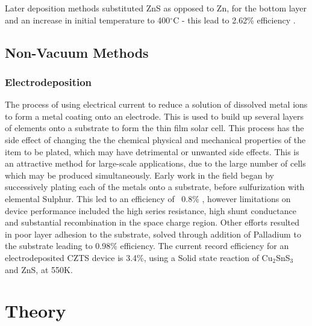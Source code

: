 Later deposition methods substituted ZnS as opposed to Zn, for the bottom layer and an increase in initial temperature to 400$^\circ$C - this lead to 2.62\% efficiency \citep{Todorov2010}.

\subsection{Non-Vacuum Methods}
\subsubsection{Electrodeposition}
The process of using electrical current to reduce a solution of dissolved metal ions to form a metal coating onto an electrode. This is used to build up several layers of elements onto a substrate to form the thin film solar cell. This process has the side effect of changing the the chemical physical and mechanical properties of the item to be plated, which may have detrimental or unwanted side effects. This is an attractive method for large-scale applications, due to the large number of cells which may be produced simultaneously. Early work in the field began by successively plating each of the metals onto a substrate, before sulfurization with elemental Sulphur. This led to an efficiency of ~0.8\% \citep{Scragg2008}, however limitations on device performance included the high series resistance, high shunt conductance and substantial recombination in the space charge region. Other efforts resulted in poor layer adhesion to the substrate, solved through addition of Palladium to the substrate leading to 0.98\% efficiency. The current record efficiency for an electrodeposited CZTS device is 3.4\%, using a Solid state reaction of Cu$_2$SnS$_3$ and ZnS, at 550K.




\section{Theory}




